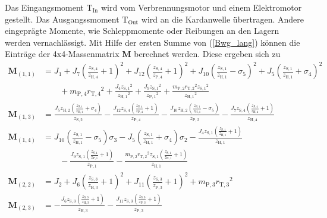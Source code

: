 Das Eingangsmoment $\mathrm{T}_{\mathrm{In}}$ wird vom Verbrennungsmotor und einem Elektromotor gestellt. Das Ausgangssmoment $\mathrm{T}_{\mathrm{Out}}$ wird an die Kardanwelle übertragen. Andere eingeprägte Momente, wie Schleppmomente oder Reibungen an den Lagern werden vernachlässigt. Mit Hilfe der ersten Summe von (\ref{Bwg_lang}) können die Einträge der 4x4-Massenmatrix $\pmb{M}$ berechnet werden. Diese ergeben sich zu
\begin{align*}
	\pmb{M}_{(1,1)} &=  J_1+J_7\left(\frac{z_\mathrm{S,4}}{z_\mathrm{H,4}}+1\right)^2+J_{12} \left(\frac{z_\mathrm{S,4}}{z_\mathrm{P,4}}+1\right)^2+J_{10} {\left(\frac{z_\mathrm{S,1}}{z_\mathrm{H,1}} - \sigma_{5}\right)}^2+J_{5} \left(\frac{z_\mathrm{S,1}}{z_\mathrm{H,1}}+\sigma_{4}\right)^2 \\
		&\qquad + m_\mathrm{P,4} {r_\mathrm{T,4}}^2+\frac{J_{4} {z_\mathrm{S,1}}^2}{{z_\mathrm{H,1}}^2}+\frac{J_{9} {z_\mathrm{S,1}}^2}{{z_\mathrm{P,1}}^2}+\frac{m_\mathrm{P,2} {r_\mathrm{T,2}}^2 {z_\mathrm{S,1}}^2}{{z_\mathrm{H,1}}^2}\\
	\pmb{M}_{(1,3)} &= \frac{J_{5} z_\mathrm{H,2} \left(\frac{z_\mathrm{S,1}}{z_\mathrm{H,1}}+\sigma_{4}\right)}{z_\mathrm{S,2}}-\frac{J_{12} z_\mathrm{S,4} \left(\frac{z_\mathrm{S,4}}{z_\mathrm{P,4}}+1\right)}{z_\mathrm{P,4}}-\frac{J_{10} z_\mathrm{H,2} \left(\frac{z_\mathrm{S,1}}{z_\mathrm{H,1}} - \sigma_{5}\right)}{z_\mathrm{P,2}}-\frac{J_{7} z_\mathrm{S,4} \left(\frac{z_\mathrm{S,4}}{z_\mathrm{H,4}}+1\right)}{z_\mathrm{H,4}}\\
	\pmb{M}_{(1,4)} &= J_{10} \left(\frac{z_\mathrm{S,1}}{z_\mathrm{H,1}}-\sigma_{5}\right) \sigma_{3} - J_{5} \left(\frac{z_\mathrm{S,1}}{z_\mathrm{H,1}}+\sigma_{4}\right) \sigma_{2} -\frac{J_{4} z_\mathrm{S,1} \left(\frac{z_\mathrm{S,1}}{z_\mathrm{H,1}}+1\right)}{z_\mathrm{H,1}}\\
		&\qquad-\frac{J_{9} z_\mathrm{S,1} \left(\frac{z_\mathrm{S,1}}{z_\mathrm{P,1}}+1\right)}{z_\mathrm{P,1}}-\frac{m_\mathrm{P,2} {r_\mathrm{T,2}}^2 z_\mathrm{S,1} \left(\frac{z_\mathrm{S,1}}{z_\mathrm{H,1}}+1\right)}{z_\mathrm{H,1}}\\
	\pmb{M}_{(2,2)} &= J_2+J_6 \left(\frac{z_\mathrm{S,3}}{z_\mathrm{H,3}}+1\right)^2+J_{11} \left(\frac{z_\mathrm{S,3}}{z_\mathrm{P,3}}+1\right)^2+m_\mathrm{P,3} {r_\mathrm{T,3}}^2\\
	\pmb{M}_{(2,3)} &= -\frac{J_{6} z_\mathrm{S,3} \left(\frac{z_\mathrm{S,3}}{z_\mathrm{H,3}}+1\right)}{z_\mathrm{H,3}}-\frac{J_{11} z_\mathrm{S,3} \left(\frac{z_\mathrm{S,3}}{z_\mathrm{P,3}}+1\right)}{z_\mathrm{P,3}}\\

\end{align*}
